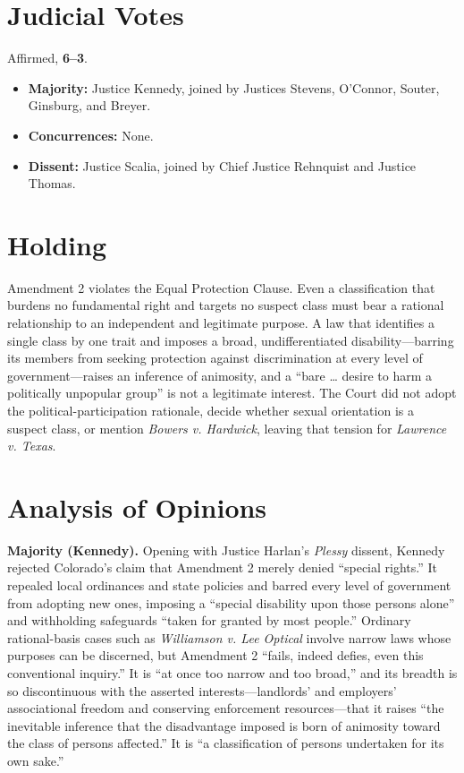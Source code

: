 \documentclass[12pt]{article}
\begin{document}
\section{Judicial Votes}

Affirmed, \textbf{6--3}.
\begin{itemize}
\item \textbf{Majority:} Justice Kennedy, joined by Justices Stevens, O'Connor, Souter, Ginsburg, and Breyer.
\item \textbf{Concurrences:} None.
\item \textbf{Dissent:} Justice Scalia, joined by Chief Justice Rehnquist and Justice Thomas.
\end{itemize}

\section{Holding}

Amendment 2 violates the Equal Protection Clause. Even a classification that burdens no fundamental right and targets no suspect class must bear a rational relationship to an independent and legitimate purpose. A law that identifies a single class by one trait and imposes a broad, undifferentiated disability---barring its members from seeking protection against discrimination at every level of government---raises an inference of animosity, and a ``bare \dots{} desire to harm a politically unpopular group'' is not a legitimate interest. The Court did not adopt the political-participation rationale, decide whether sexual orientation is a suspect class, or mention \textit{Bowers v. Hardwick}, leaving that tension for \textit{Lawrence v. Texas}.

\section{Analysis of Opinions}

\textbf{Majority (Kennedy).} Opening with Justice Harlan's \textit{Plessy} dissent, Kennedy rejected Colorado's claim that Amendment 2 merely denied ``special rights.'' It repealed local ordinances and state policies and barred every level of government from adopting new ones, imposing a ``special disability upon those persons alone'' and withholding safeguards ``taken for granted by most people.'' Ordinary rational-basis cases such as \textit{Williamson v. Lee Optical} involve narrow laws whose purposes can be discerned, but Amendment 2 ``fails, indeed defies, even this conventional inquiry.'' It is ``at once too narrow and too broad,'' and its breadth is so discontinuous with the asserted interests---landlords' and employers' associational freedom and conserving enforcement resources---that it raises ``the inevitable inference that the disadvantage imposed is born of animosity toward the class of persons affected.'' It is ``a classification of persons undertaken for its own sake.''
\end{document}
